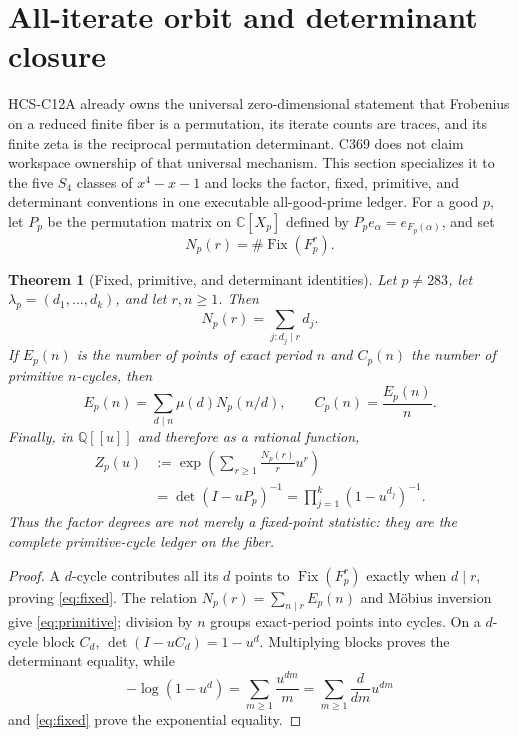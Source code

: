 \documentclass[10pt]{article}
\newtheorem{theorem}{Theorem}
\newcommand{\Fix}{\operatorname{Fix}}
\begin{document}
\section{All-iterate orbit and determinant closure}
HCS-C12A already owns the universal zero-dimensional statement that
Frobenius on a reduced finite fiber is a permutation, its iterate counts are
traces, and its finite zeta is the reciprocal permutation determinant.
C369 does not claim workspace ownership of that universal mechanism.  This
section specializes it to the five $S_4$ classes of $x^4-x-1$ and locks the
factor, fixed, primitive, and determinant conventions in one executable
all-good-prime ledger.
For a good $p$, let $P_p$ be the permutation matrix on
$\mathbb C[X_p]$ defined by $P_pe_\alpha=e_{F_p(\alpha)}$, and set
\[
 N_p(r)=\#\Fix(F_p^r).
\]

\begin{theorem}[Fixed, primitive, and determinant identities]\label{thm:zeta}
Let $p\ne283$, let $\lambda_p=(d_1,\ldots,d_k)$, and let $r,n\ge1$.
Then
\begin{equation}\label{eq:fixed}
 N_p(r)=\sum_{j:d_j\mid r}d_j.
\end{equation}
If $E_p(n)$ is the number of points of exact period $n$ and $C_p(n)$ the
number of primitive $n$-cycles, then
\begin{equation}\label{eq:primitive}
 E_p(n)=\sum_{d\mid n}\mu(d)N_p(n/d),
 \qquad C_p(n)=\frac{E_p(n)}n.
\end{equation}
Finally, in $\mathbb Q[[u]]$ and therefore as a rational function,
\begin{equation}\label{eq:zeta}
 \begin{split}
 Z_p(u)&:=\exp\!\left(\sum_{r\ge1}\frac{N_p(r)}r u^r\right)\\
 &=\det(I-uP_p)^{-1}
 =\prod_{j=1}^k(1-u^{d_j})^{-1}.
 \end{split}
\end{equation}
Thus the factor degrees are not merely a fixed-point statistic: they are
the complete primitive-cycle ledger on the fiber.
\end{theorem}

\begin{proof}
A $d$-cycle contributes all its $d$ points to $\Fix(F_p^r)$ exactly when
$d\mid r$, proving \eqref{eq:fixed}.  The relation
$N_p(r)=\sum_{n\mid r}E_p(n)$ and M\"obius inversion give
\eqref{eq:primitive}; division by $n$ groups exact-period points into
cycles.  On a $d$-cycle block $C_d$,
$\det(I-uC_d)=1-u^d$.  Multiplying blocks proves the determinant equality,
while
\[
 -\log(1-u^d)=\sum_{m\ge1}\frac{u^{dm}}m
 =\sum_{m\ge1}\frac d{dm}u^{dm}
\]
and \eqref{eq:fixed} prove the exponential equality.
\end{proof}
\end{document}
